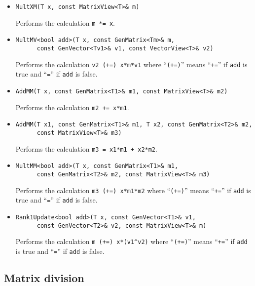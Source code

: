 \documentclass[twoside,letterpaper,11pt]{article}
\renewcommand{\tt}[1]{{\texttt {#1}}}
\begin{document}
\begin{itemize}

\item
\begin{verbatim}
MultXM(T x, const MatrixView<T>& m)
\end{verbatim}
Performs the calculation \tt{m *= x}.

\item
\begin{verbatim}
MultMV<bool add>(T x, const GenMatrix<Tm>& m, 
      const GenVector<Tv1>& v1, const VectorView<T>& v2)
\end{verbatim}
Performs the calculation \tt{v2 (+=) x*m*v1} 
where ``\tt{(+=)}'' means ``\tt{+=}'' 
if \tt{add} is true and ``\tt{=}'' if \tt{add} is false.

\item
\begin{verbatim}
AddMM(T x, const GenMatrix<T1>& m1, const MatrixView<T>& m2)
\end{verbatim}
Performs the calculation \tt{m2 += x*m1}.

\item
\begin{verbatim}
AddMM(T x1, const GenMatrix<T1>& m1, T x2, const GenMatrix<T2>& m2,
      const MatrixView<T>& m3)
\end{verbatim}
Performs the calculation \tt{m3 = x1*m1 + x2*m2}.

\item
\begin{verbatim}
MultMM<bool add>(T x, const GenMatrix<T1>& m1, 
      const GenMatrix<T2>& m2, const MatrixView<T>& m3)
\end{verbatim}
Performs the calculation \tt{m3 (+=) x*m1*m2} 
where ``\tt{(+=)}'' means ``\tt{+=}'' 
if \tt{add} is true and ``\tt{=}'' if \tt{add} is false.

\item
\begin{verbatim}
Rank1Update<bool add>(T x, const GenVector<T1>& v1, 
      const GenVector<T2>& v2, const MatrixView<T>& m)
\end{verbatim}
Performs the calculation \tt{m (+=) x*(v1\^{}v2)} 
where ``\tt{(+=)}'' means ``\tt{+=}'' 
if \tt{add} is true and ``\tt{=}'' if \tt{add} is false.

\end{itemize}

\subsection{Matrix division}
\label{division}
\end{document}
